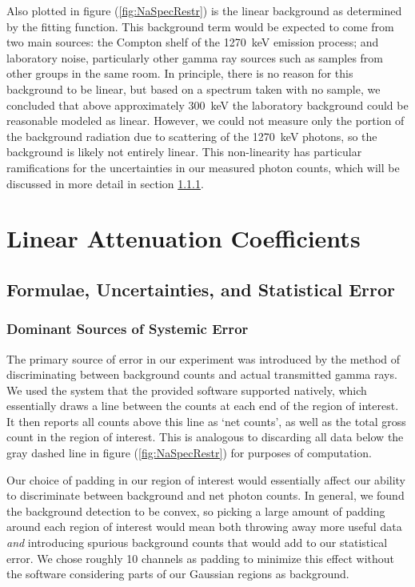 \documentclass[letter]{article}
\begin{document}
Also plotted in figure (\ref{fig:NaSpecRestr}) is the linear background as determined by the fitting function. This background term would be expected to come from two main sources: the Compton shelf of the \qty{1270}{\kilo\electronvolt} emission process; and laboratory noise, particularly other gamma ray sources such as samples from other groups in the same room. In principle, there is no reason for this background to be linear, but based on a spectrum taken with no sample, we concluded that above approximately \qty{300}{\kilo\electronvolt} the laboratory background could be reasonable modeled as linear. However, we could not measure only the portion of the background radiation due to scattering of the \qty{1270}{\kilo\electronvolt} photons, so the background is likely not entirely linear. This non-linearity has particular ramifications for the uncertainties in our measured photon counts, which will be discussed in more detail in section \ref{sss:SysError}.


\section{Linear Attenuation Coefficients}

\subsection{Formulae, Uncertainties, and Statistical Error}

\subsubsection{Dominant Sources of Systemic Error} \label{sss:SysError}

The primary source of error in our experiment was introduced by the method of discriminating between background counts and actual transmitted gamma rays. We used the system that the provided software supported natively, which essentially draws a line between the counts at each end of the region of interest. It then reports all counts above this line as `net counts', as well as the total gross count in the region of interest. This is analogous to discarding all data below the gray dashed line in figure (\ref{fig:NaSpecRestr}) for purposes of computation.

Our choice of padding in our region of interest would essentially affect our ability to discriminate between background and net photon counts. In general, we found the background detection to be convex, so picking a large amount of padding around each region of interest would mean both throwing away more useful data \textit{and} introducing spurious background counts that would add to our statistical error. We chose roughly 10 channels as padding to minimize this effect without the software considering parts of our Gaussian regions as background.
\end{document}
